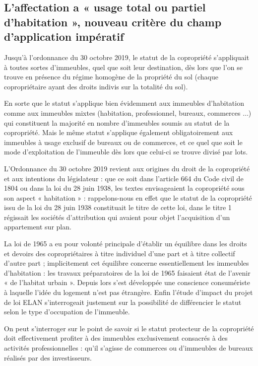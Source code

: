 	\subsection{L’affectation a « usage total ou partiel d’habitation », nouveau critère du champ d’application impératif}

		Jusqu’à l’ordonnance du 30 octobre 2019, le statut de la copropriété s’appliquait à toutes sortes
		d’immeubles, quel que soit leur destination, dès lors que l’on se trouve en présence du régime homogène
		de la propriété du sol (chaque copropriétaire ayant des droits indivis sur la totalité du sol).
		
		En sorte que le statut s’applique bien évidemment aux immeubles d’habitation comme aux immeubles
		mixtes (habitation, professionnel, bureaux, commerces $\dots$) qui constituent la majorité en nombre
		d’immeubles soumis au statut de la copropriété. Mais le même statut s’applique également
		obligatoirement aux immeubles à usage exclusif de bureaux ou de commerces, et ce quel que soit le mode
		d’exploitation de l’immeuble dès lors que celui-ci se trouve divisé par lots.
		
		L’Ordonnance du 30 octobre 2019 revient aux origines du droit de la copropriété et aux intentions du
		législateur : que ce soit dans l’article 664 du Code civil de 1804 ou dans la loi du 28 juin 1938, les textes
		envisageaient la copropriété sous son aspect « habitation » : rappelons-nous en effet que le statut de la
		copropriété issu de la loi du 28 juin 1938 constituait le titre \II{} de cette loi, dans le titre 1\ier{} régissait les
		sociétés d’attribution qui avaient pour objet l’acquisition d’un appartement sur plan.
		
		La loi de 1965 a eu pour volonté principale d’établir un équilibre dans les droits et devoirs des
		copropriétaires à titre individuel d’une part et à titre collectif d’autre part ; implicitement cet équilibre
		concerne essentiellement les immeubles d’habitation : les travaux préparatoires de la loi de 1965 faisaient
		état de l’avenir « de l’habitat urbain ». Depuis lors s’est développée une conscience consumériste à laquelle
		l’idée du logement n’est pas étrangère. Enfin l’étude d’impact du projet de loi ELAN s’interrogeait
		justement sur la possibilité de différencier le statut selon le type d’occupation de l’immeuble.
		
		On peut s’interroger sur le point de savoir si le statut protecteur de la copropriété doit effectivement
		profiter à des immeubles exclusivement consacrés à des activités professionnelles : qu’il s’agisse de
		commerces ou d’immeubles de bureaux réalisés par des investisseurs.
		
